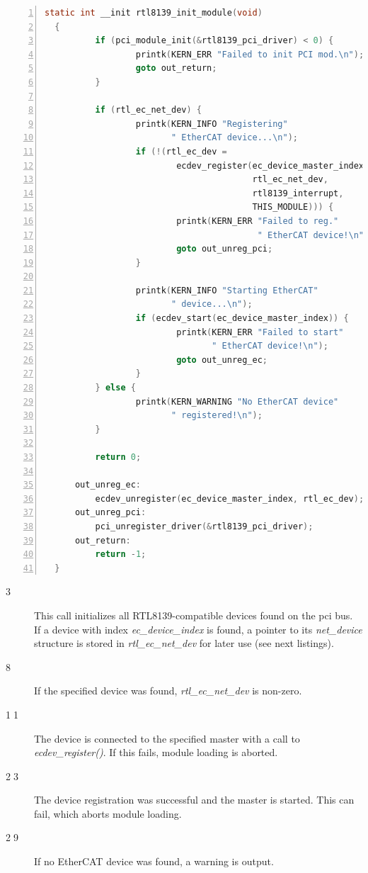 \documentclass[a4paper,12pt,BCOR6mm,bibtotoc,idxtotoc]{scrbook}
\begin{document}
\begin{lstlisting}[language=C,numbers=left]
  static int __init rtl8139_init_module(void)
  {
          if (pci_module_init(&rtl8139_pci_driver) < 0) {
                  printk(KERN_ERR "Failed to init PCI mod.\n");
                  goto out_return;
          }

          if (rtl_ec_net_dev) {
                  printk(KERN_INFO "Registering"
                         " EtherCAT device...\n");
                  if (!(rtl_ec_dev =
                          ecdev_register(ec_device_master_index,
                                         rtl_ec_net_dev,
                                         rtl8139_interrupt,
                                         THIS_MODULE))) {
                          printk(KERN_ERR "Failed to reg."
                                          " EtherCAT device!\n");
                          goto out_unreg_pci;
                  }

                  printk(KERN_INFO "Starting EtherCAT"
                         " device...\n");
                  if (ecdev_start(ec_device_master_index)) {
                          printk(KERN_ERR "Failed to start"
                                 " EtherCAT device!\n");
                          goto out_unreg_ec;
                  }
          } else {
                  printk(KERN_WARNING "No EtherCAT device"
                         " registered!\n");
          }

          return 0;

      out_unreg_ec:
          ecdev_unregister(ec_device_master_index, rtl_ec_dev);
      out_unreg_pci:
          pci_unregister_driver(&rtl8139_pci_driver);
      out_return:
          return -1;
  }
\end{lstlisting}

\begin{description}
\item[\normalfont\textcircled{\tiny 3}] This call initializes all
  RTL8139-compatible devices found on the pci bus. If a device with
  index \textit{ec\_device\_index} is found, a pointer to its
  \textit{net\_device} structure is stored in
  \textit{rtl\_ec\_net\_dev} for later use (see next listings).
\item[\normalfont\textcircled{\tiny 8}] If the specified device was
  found, \textit{rtl\_ec\_net\_dev} is non-zero.
\item[\normalfont\textcircled{\tiny 11}] The device is connected to
  the specified master with a call to \textit{ecdev\_register()}. If
  this fails, module loading is aborted.
\item[\normalfont\textcircled{\tiny 23}] The device registration was
  successful and the master is started. This can fail, which aborts
  module loading.
\item[\normalfont\textcircled{\tiny 29}] If no EtherCAT device was
  found, a warning is output.
\end{description}
\end{document}

